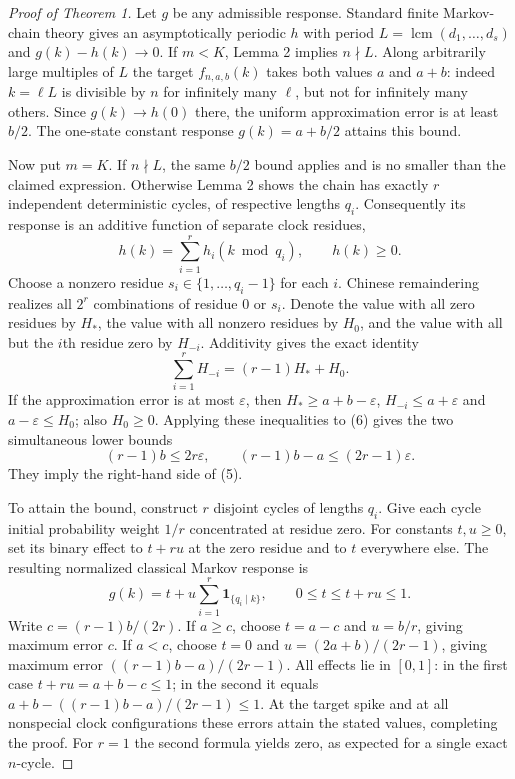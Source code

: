 \documentclass[11pt,a4paper,oneside]{book}
\newcommand{\one}{\mathbf 1}\newcommand{\ii}{\mathrm i}\newcommand{\dd}{\mathrm d}
\DeclareMathOperator{\lcm}{lcm}\DeclareMathOperator{\spanR}{span_{\mathbb R}}
\begin{document}
\begin{proof}[Proof of Theorem 1]Let $g$ be any admissible response. Standard finite Markov-chain theory gives an asymptotically periodic $h$ with period $L=\lcm(d_1,\ldots,d_s)$ and $g(k)-h(k)\to0$. If $m<K$, Lemma 2 implies $n\nmid L$. Along arbitrarily large multiples of $L$ the target $f_{n,a,b}(k)$ takes both values $a$ and $a+b$: indeed $k=\ell L$ is divisible by $n$ for infinitely many $\ell$, but not for infinitely many others. Since $g(k)\to h(0)$ there, the uniform approximation error is at least $b/2$. The one-state constant response $g(k)=a+b/2$ attains this bound.

Now put $m=K$. If $n\nmid L$, the same $b/2$ bound applies and is no smaller than the claimed expression. Otherwise Lemma 2 shows the chain has exactly $r$ independent deterministic cycles, of respective lengths $q_i$. Consequently its response is an additive function of separate clock residues,
\[h(k)=\sum_{i=1}^r h_i(k\bmod q_i),\qquad h(k)\ge0.\]
Choose a nonzero residue $s_i\in\{1,\ldots,q_i-1\}$ for each $i$. Chinese remaindering realizes all $2^r$ combinations of residue $0$ or $s_i$. Denote the value with all zero residues by $H_*$, the value with all nonzero residues by $H_0$, and the value with all but the $i$th residue zero by $H_{-i}$. Additivity gives the exact identity
\begin{equation}\sum_{i=1}^rH_{-i}=(r-1)H_*+H_0.\tag{6}\end{equation}
If the approximation error is at most $\varepsilon$, then $H_*\ge a+b-\varepsilon$, $H_{-i}\le a+\varepsilon$ and $a-\varepsilon\le H_0$; also $H_0\ge0$. Applying these inequalities to (6) gives the two simultaneous lower bounds
\begin{equation}(r-1)b\le2r\varepsilon,\qquad (r-1)b-a\le(2r-1)\varepsilon.\tag{7}\end{equation}
They imply the right-hand side of (5).

To attain the bound, construct $r$ disjoint cycles of lengths $q_i$. Give each cycle initial probability weight $1/r$ concentrated at residue zero. For constants $t,u\ge0$, set its binary effect to $t+ru$ at the zero residue and to $t$ everywhere else. The resulting normalized classical Markov response is
\begin{equation}g(k)=t+u\sum_{i=1}^r\one_{\{q_i\mid k\}},\qquad0\le t\le t+ru\le1.\tag{8}\end{equation}
Write $c=(r-1)b/(2r)$. If $a\ge c$, choose $t=a-c$ and $u=b/r$, giving maximum error $c$. If $a<c$, choose $t=0$ and $u=(2a+b)/(2r-1)$, giving maximum error $((r-1)b-a)/(2r-1)$. All effects lie in $[0,1]$: in the first case $t+ru=a+b-c\le1$; in the second it equals $a+b-((r-1)b-a)/(2r-1)\le1$. At the target spike and at all nonspecial clock configurations these errors attain the stated values, completing the proof. For $r=1$ the second formula yields zero, as expected for a single exact $n$-cycle.\end{proof}
\end{document}
